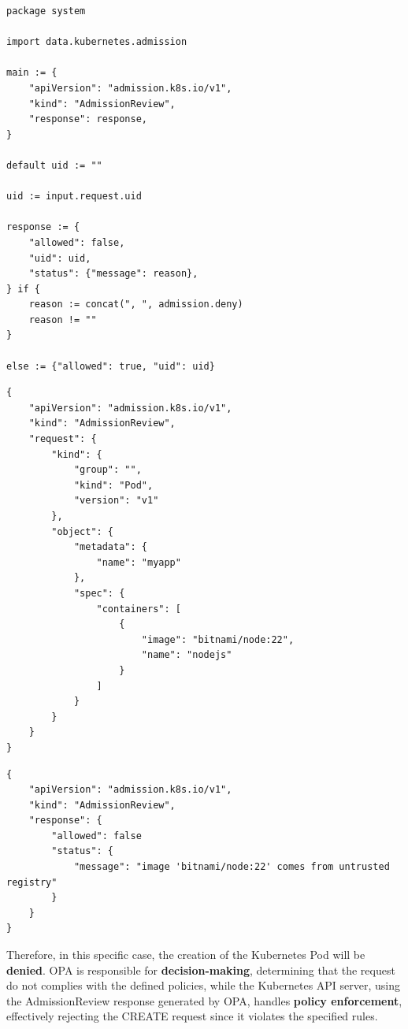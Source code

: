 \begin{lstlisting}[language=Rego, caption={Rego ``root" policy (system.main)}, label=lst:rego_root_policy]
package system

import data.kubernetes.admission

main := {
	"apiVersion": "admission.k8s.io/v1",
	"kind": "AdmissionReview",
	"response": response,
}

default uid := ""

uid := input.request.uid

response := {
	"allowed": false,
	"uid": uid,
	"status": {"message": reason},
} if {
	reason := concat(", ", admission.deny)
	reason != ""
}

else := {"allowed": true, "uid": uid}
\end{lstlisting}

\lstset{style=jsonstyle}
\begin{lstlisting}[caption={AdmissionReview request}, label={lst:admission_review_request}]
{
    "apiVersion": "admission.k8s.io/v1",
    "kind": "AdmissionReview",
    "request": {
        "kind": {
            "group": "",
            "kind": "Pod",
            "version": "v1"
        },
        "object": {
            "metadata": {
                "name": "myapp"
            },
            "spec": {
                "containers": [
                    {
                        "image": "bitnami/node:22",
                        "name": "nodejs"
                    }
                ]
            }
        }
    }
}
\end{lstlisting}

\lstset{style=jsonstyle}
\begin{lstlisting}[caption={AdmissionReview response}, label={lst:admission_review_response}]
{
    "apiVersion": "admission.k8s.io/v1",
    "kind": "AdmissionReview",
    "response": {
        "allowed": false
        "status": {
            "message": "image 'bitnami/node:22' comes from untrusted registry"
        }
    }
}
\end{lstlisting}

Therefore, in this specific case, the creation of the Kubernetes Pod will be \textbf{denied}. 
OPA is responsible for \textbf{decision-making}, determining that the request do not complies with the defined policies, while the Kubernetes API server, using the AdmissionReview response generated by OPA, handles \textbf{policy enforcement}, effectively rejecting the CREATE request since it violates the specified rules.

